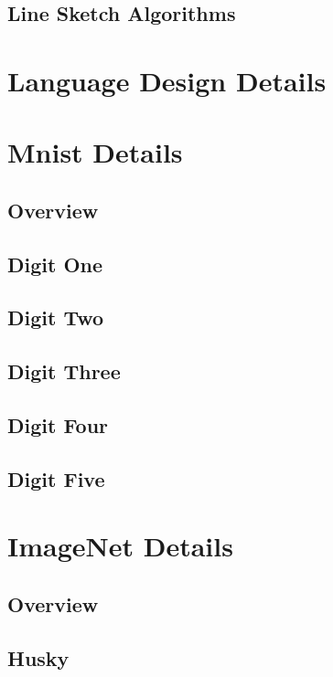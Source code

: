 \documentclass[11pt]{article} 	%
\theoremstyle{definition}
\begin{document}
\subsection{Line Sketch Algorithms}


\section{Language Design Details}

\section{Mnist Details}

\subsection{Overview}


\subsection{Digit One}

\subsection{Digit Two}

\subsection{Digit Three}

\subsection{Digit Four}

\subsection{Digit Five}

\section{ImageNet Details}

\subsection{Overview}

\subsection{Husky}
\end{document}
